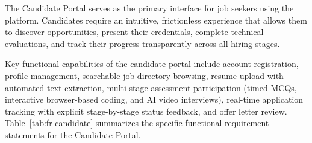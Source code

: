 The Candidate Portal serves as the primary interface for job seekers using the platform. Candidates require an intuitive, frictionless experience that allows them to discover opportunities, present their credentials, complete technical evaluations, and track their progress transparently across all hiring stages.

Key functional capabilities of the candidate portal include account registration, profile management, searchable job directory browsing, resume upload with automated text extraction, multi-stage assessment participation (timed MCQs, interactive browser-based coding, and AI video interviews), real-time application tracking with explicit stage-by-stage status feedback, and offer letter review. Table~\ref{tab:fr-candidate} summarizes the specific functional requirement statements for the Candidate Portal.

